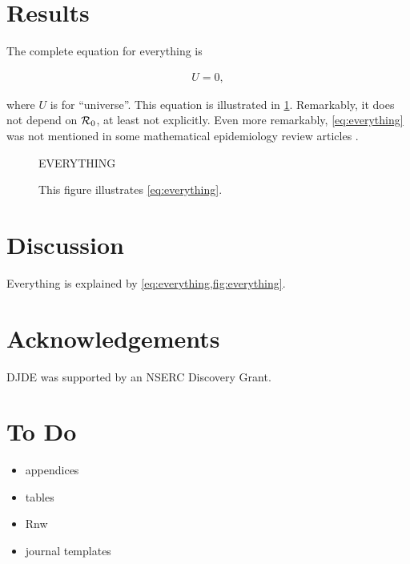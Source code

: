 \documentclass[9pt,twocolumn,twoside]{pnas/pnas_research_article/pnas-new}
\begin{document}
\section{Results}\label{sec:results}

The complete equation for everything is
\begin{linenomath*}
\begin{align}\label{eq:everything}
  U = 0,
\end{align}
\end{linenomath*}
where $U$ is for ``universe''.  This equation is illustrated
in \cref{fig:everything}.  Remarkably, it does not depend on ${\mathcal R}_0$,
at least not explicitly.  Even more remarkably, \cref{eq:everything}
was not mentioned in some mathematical epidemiology review articles
\cite{Earn+02,Earn04,Earn08,Earn09}.

\begin{figure}
  \begin{center}
    \Huge EVERYTHING
  \end{center}
  \caption{This figure illustrates \cref{eq:everything}.}
  \label{fig:everything}
\end{figure}

\section{Discussion}\label{sec:discussion}

Everything is explained by \cref{eq:everything,fig:everything}.

\section*{Acknowledgements}

DJDE was supported by an NSERC Discovery Grant.






\appendix

\section{To Do}\label{app:ToDo}

\begin{itemize}
\item appendices
\item tables
\item Rnw
\item journal templates
\end{itemize}
\end{document}
